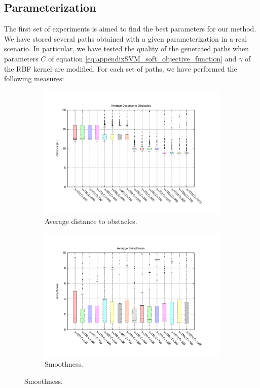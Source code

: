 \subsection{Parameterization}\label{ch:chapter06_02_01}

The first set of experiments is aimed to find the best parameters for our method. We have stored several paths obtained with a given parameterization in a real scenario. In particular, we have tested the quality of the generated paths when parameters $C$ of equation \ref{eq:appendixSVM_soft_objective_function} and $\gamma$ of the \ac{RBF} kernel are modified. For each set of paths, we have performed the following measures:

\begin{figure}[h!]
  \centering
  \begin{subfigure}[b]{\textwidth}
	  \centering
	  \includegraphics[width=\textwidth,height=0.5\textwidth,trim=55 50 85 60,clip]{figure8}
	  \caption{Average distance to obstacles.}
	  \label{fig:cp06_avg_dist_msvmpp}
  \end{subfigure}  

  \begin{subfigure}[b]{\textwidth}
	  \centering
	  \includegraphics[width=\textwidth,height=0.5\textwidth,trim=55 50 85 60,clip]{figure9}
	  \caption{Smoothness.}
	  \label{fig:cp06_smoothness_msvmpp}
  \end{subfigure}        
\end{figure}


